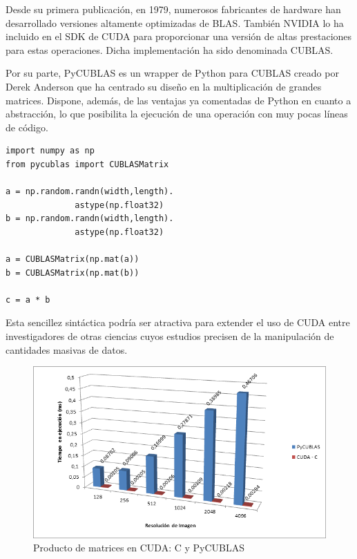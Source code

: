 \documentclass[twocolumn,twoside]{Jornadas}
\begin{document}

Desde su primera publicación, en 1979, numerosos fabricantes de hardware han desarrollado versiones altamente optimizadas de BLAS. También NVIDIA lo ha incluido en el SDK de CUDA para proporcionar una versión de altas prestaciones para estas operaciones. Dicha implementación ha sido denominada CUBLAS.


Por su parte, PyCUBLAS es un wrapper \cite{pycublas} de Python para CUBLAS creado por Derek Anderson que ha centrado su diseño en la multiplicación de grandes matrices. Dispone, además, de las ventajas ya comentadas de Python en cuanto a abstracción, lo que posibilita la ejecución de una operación con muy pocas líneas de código.

\begin{lstlisting}
import numpy as np
from pycublas import CUBLASMatrix

a = np.random.randn(width,length).
              astype(np.float32)
b = np.random.randn(width,length).
              astype(np.float32)

a = CUBLASMatrix(np.mat(a))
b = CUBLASMatrix(np.mat(b))

c = a * b
\end{lstlisting}

Esta sencillez sintáctica podría ser atractiva para extender el uso de CUDA entre investigadores de otras ciencias cuyos estudios precisen de la manipulación de cantidades masivas de datos. 

\begin{figure}[t]
   \begin{center}
      \includegraphics[width=.5\textwidth]{pycublas.png}
      \caption{\label{fig:pycublas}Producto de matrices en CUDA: C y PyCUBLAS}
   \end{center}
\end{figure}
\end{document}
